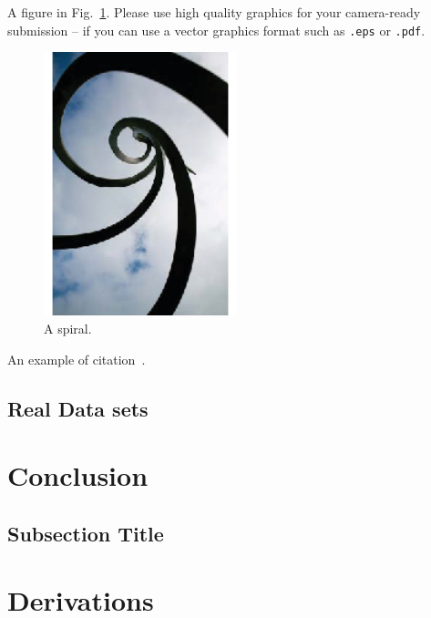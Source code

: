 \documentclass[wcp]{jmlr}
\newcommand{\1}{\mathbbm{1}}
\begin{document}
A figure in Fig.~\ref{fig:spiral}. Please use high quality graphics
for your camera-ready submission -- if you can use a vector graphics
format such as \texttt{.eps} or \texttt{.pdf}.
\begin{figure}[htp]
\begin{center}
\includegraphics[width=0.5\textwidth]{spiral.eps}
\caption{A spiral.}\label{fig:spiral}
\end{center}
\end{figure}

An example of citation~\cite{DBLP:conf/acml/2009}.

\subsection{Real Data sets}

\section{Conclusion}

\subsection{Subsection Title}




%


\appendix

\section{Derivations}\label{apd:first}
\end{document}
